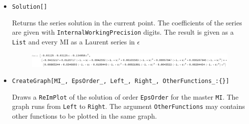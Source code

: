 \begin{itemize}
    \item \texttt{Solution[]}
    
    Returns the series solution in the current point. The coefficients of the series are given with \texttt{InternalWorkingPrecision} digits. The result is given as a \texttt{List} and every MI as a Laurent series in $\epsilon$
    \begin{figure}[!h]
        \centering
        \includegraphics[width=\textwidth]{Images/Code7.pdf}
    \end{figure}
    
    
    
    
    
    \item {\small\texttt{CreateGraph[MI\_, EpsOrder\_, Left\_, Right\_, OtherFunctions\_:\{\}]}}
    
    Draws a \texttt{ReImPlot} of the solution of order \texttt{EpsOrder} for the master \texttt{MI}. The graph runs from \texttt{Left} to \texttt{Right}. 
    The argument \texttt{OtherFunctions} may contains other functions to be plotted in the same graph.
\end{itemize}






